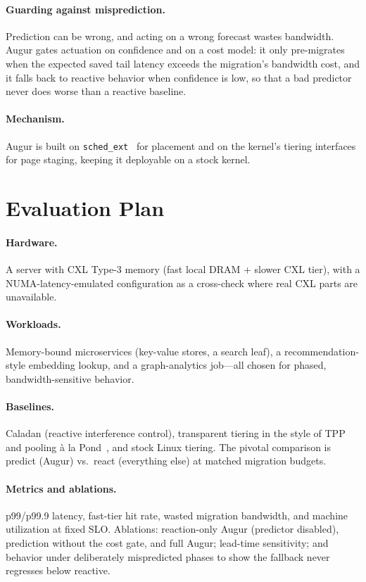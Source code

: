 \documentclass[sigconf,nonacm]{acmart}
\begin{document}
\paragraph{Guarding against misprediction.}
Prediction can be wrong, and acting on a wrong forecast wastes bandwidth. Augur
gates actuation on confidence and on a cost model: it only pre-migrates when the
expected saved tail latency exceeds the migration's bandwidth cost, and it falls
back to reactive behavior when confidence is low, so that a bad predictor never
does worse than a reactive baseline.

\paragraph{Mechanism.}
Augur is built on \texttt{sched\_ext}~\cite{linux-schedext} for placement and on
the kernel's tiering interfaces for page staging, keeping it deployable on a
stock kernel.

\section{Evaluation Plan}
\paragraph{Hardware.} A server with CXL Type-3 memory (fast local DRAM + slower
CXL tier), with a NUMA-latency-emulated configuration as a cross-check where real
CXL parts are unavailable.

\paragraph{Workloads.} Memory-bound microservices (key-value stores, a search
leaf), a recommendation-style embedding lookup, and a graph-analytics job---all
chosen for phased, bandwidth-sensitive behavior.

\paragraph{Baselines.} Caladan (reactive interference control), transparent
tiering in the style of TPP~\cite{maruf2023tpp} and pooling \`a la
Pond~\cite{li2023pond}, and stock Linux tiering. The pivotal comparison is
predict (Augur) vs.\ react (everything else) at matched migration budgets.

\paragraph{Metrics and ablations.} p99/p99.9 latency, fast-tier hit rate, wasted
migration bandwidth, and machine utilization at fixed SLO. Ablations: reaction-only
Augur (predictor disabled), prediction without the cost gate, and full Augur;
lead-time sensitivity; and behavior under deliberately mispredicted phases to show
the fallback never regresses below reactive.
\end{document}
